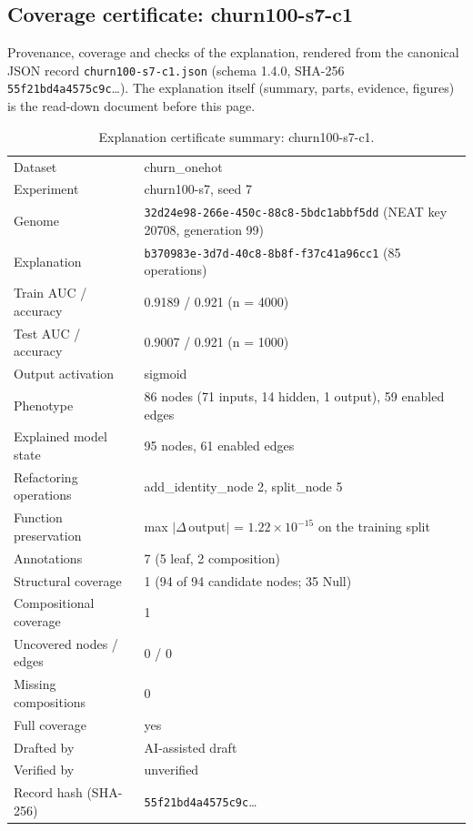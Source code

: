 \providecommand{\explaneatcertdir}[1]{}
\begin{drafted}
\section{Coverage certificate: churn100-s7-c1}\label{app:churn100-s7-c1:sec}
Provenance, coverage and checks of the explanation, rendered from the canonical JSON record \texttt{churn100-s7-c1.json} (schema 1.4.0, SHA-256 \texttt{55f21bd4a4575c9c}\ldots). The explanation itself (summary, parts, evidence, figures) is the read-down document before this page.

\begin{table}[htbp]
\centering\small
\begin{tabularx}{\linewidth}{@{}lX@{}}
\toprule
Dataset & churn\_\allowbreak{}onehot \\
Experiment & churn100-s7, seed 7 \\
Genome & \texttt{32d24e98-266e-450c-88c8-5bdc1abbf5dd} (NEAT key 20708, generation 99) \\
Explanation & \texttt{b370983e-3d7d-40c8-8b8f-f37c41a96cc1} (85 operations) \\
Train AUC / accuracy & 0.9189 / 0.921 (n = 4000) \\
Test AUC / accuracy & 0.9007 / 0.921 (n = 1000) \\
Output activation & sigmoid \\
Phenotype & 86 nodes (71 inputs, 14 hidden, 1 output), 59 enabled edges \\
Explained model state & 95 nodes, 61 enabled edges \\
Refactoring operations & add\_\allowbreak{}identity\_\allowbreak{}node 2, split\_\allowbreak{}node 5 \\
Function preservation & max $|\Delta\,\mathrm{output}|$ = $1.22\times 10^{-15}$ on the training split \\
Annotations & 7 (5 leaf, 2 composition) \\
Structural coverage & 1 (94 of 94 candidate nodes; 35 Null) \\
Compositional coverage & 1 \\
Uncovered nodes / edges & 0 / 0 \\
Missing compositions & 0 \\
Full coverage & yes \\
Drafted by & AI-assisted draft \\
Verified by & unverified \\
Record hash (SHA-256) & \texttt{55f21bd4a4575c9c}\ldots \\
\bottomrule
\end{tabularx}
\caption{Explanation certificate summary: churn100-s7-c1.}
\label{app:churn100-s7-c1:summary}
\end{table}

\end{drafted}
